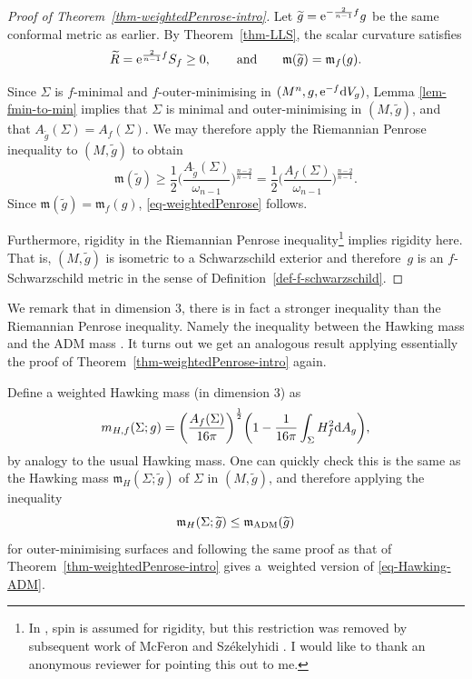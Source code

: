 \documentclass[pdftex]{sigma}
\numberwithin{equation}{section}
\theoremstyle{definition}
\begin{document}
\begin{proof}[Proof of Theorem~\ref{thm-weightedPenrose-intro}]
	Let $\widetilde g={\rm e}^{-\frac{2}{n-1}f}g$ be the same conformal metric as earlier.
	By Theorem~\ref{thm-LLS}, the scalar curvature satisfies
	\[
	\widetilde R = {\rm e}^{\frac{2}{n-1}f}S_f\geq0,
	\qquad \text{and} \qquad
	\mathfrak{m}(\widetilde g)=\mathfrak{m}_f(g).
	\]
	
	Since $\Sigma$ is $f$-minimal and $f$-outer-minimising in $(M^n,g,{\rm e}^{-f} {\rm d}V_g)$, Lemma \ref{lem-fmin-to-min} implies that
	$\Sigma$ is minimal and outer-minimising in $(M,\widetilde g)$, and that $A_{\widetilde g}(\Sigma)=A_f(\Sigma)$.
	We may therefore apply the Riemannian Penrose inequality \cite{Bray01,BrayLee09, HuiskenIlmanen01} to $(M,\widetilde g)$ to obtain
	\[
	\mathfrak{m}(\widetilde g) \ge \frac12\biggl(\frac{A_{\widetilde g}(\Sigma)}{\omega_{n-1}}\biggr)^{\frac{n-2}{n-1}}
	=\frac12\biggl(\frac{A_f(\Sigma)}{\omega_{n-1}}\biggr)^{\frac{n-2}{n-1}}.
	\]
	Since $\mathfrak{m}(\widetilde g)=\mathfrak{m}_f(g)$, \eqref{eq-weightedPenrose} follows.
	
	Furthermore, rigidity in the Riemannian Penrose inequality\footnote{In \cite{BrayLee09}, spin is assumed for rigidity, but this restriction was removed by subsequent work of McFeron and Sz{\'e}kelyhidi \cite{mcferon2012positive}. I would like to thank an anonymous reviewer for pointing this out to me.} implies rigidity here. That is, $(M,\widetilde g)$ is isometric to a Schwarzschild exterior and therefore~$g$ is an $f$-Schwarzschild metric in the sense of Definition~\ref{def-f-schwarzschild}.
\end{proof}


We remark that in dimension $3$, there is in fact a stronger inequality than the Riemannian Penrose inequality. Namely the inequality between the Hawking mass and the ADM mass \cite{HuiskenIlmanen01}. It turns out we get an analogous result applying essentially the proof of Theorem~\ref{thm-weightedPenrose-intro} again.

Define a weighted Hawking mass (in dimension $3$) as
\begin{equation}\label{eq-weighted-hawking-formula}
	m_{H,f}(\Sigma;g)
	=\biggl(\frac{A_f(\Sigma)}{16\pi}\biggr)^{\frac12}
	\biggl(1-\frac{1}{16\pi}\int_\Sigma H_f^{ 2} {\rm d}A_g\biggr),
\end{equation}
by analogy to the usual Hawking mass. One can quickly check this is the same as the Hawking mass $\mathfrak{m}_H(\Sigma;\widetilde g)$ of $\Sigma$ in $(M,\widetilde g)$, and therefore applying the inequality
\begin{equation}\label{eq-Hawking-ADM}
	\mathfrak{m}_H(\Sigma;\widetilde g)\leq \mathfrak{m}_{\rm ADM}(\widetilde g)
\end{equation}
for outer-minimising surfaces \cite{HuiskenIlmanen01} and following the same proof as that of Theorem~\ref{thm-weightedPenrose-intro} gives a~weighted version of \eqref{eq-Hawking-ADM}.
\end{document}
